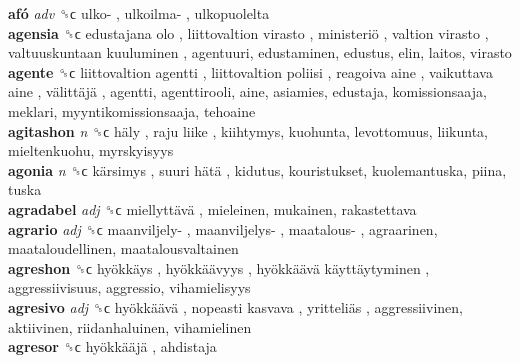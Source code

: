 \textbf{afó} \emph{adv}  ␝ϲ   ulko- ,  ulkoilma- , ulkopuolelta  \\
\textbf{agensia} ␝ϲ   edustajana olo ,  liittovaltion  virasto ,  ministeriö ,  valtion  virasto ,  valtuuskuntaan kuuluminen , agentuuri, edustaminen, edustus, elin, laitos, virasto  \\
\textbf{agente} ␝ϲ   liittovaltion agentti ,  liittovaltion poliisi ,  reagoiva aine ,  vaikuttava aine ,  välittäjä , agentti, agenttirooli, aine, asiamies, edustaja, komissionsaaja, meklari, myyntikomissionsaaja, tehoaine  \\
\textbf{agitashon} \emph{n}  ␝ϲ   häly ,  raju liike , kiihtymys, kuohunta, levottomuus, liikunta, mieltenkuohu, myrskyisyys  \\
\textbf{agonia} \emph{n}  ␝ϲ   kärsimys ,  suuri hätä , kidutus, kouristukset, kuolemantuska, piina, tuska  \\
\textbf{agradabel} \emph{adj}  ␝ϲ   miellyttävä , mieleinen, mukainen, rakastettava  \\
\textbf{agrario} \emph{adj}  ␝ϲ   maanviljely- ,  maanviljelys- ,  maatalous- , agraarinen, maataloudellinen, maatalousvaltainen  \\
\textbf{agreshon} ␝ϲ   hyökkäys ,  hyökkäävyys ,  hyökkäävä käyttäytyminen , aggressiivisuus, aggressio, vihamielisyys  \\
\textbf{agresivo} \emph{adj}  ␝ϲ   hyökkäävä ,  nopeasti kasvava ,  yritteliäs , aggressiivinen, aktiivinen, riidanhaluinen, vihamielinen  \\
\textbf{agresor} ␝ϲ   hyökkääjä , ahdistaja  \\
